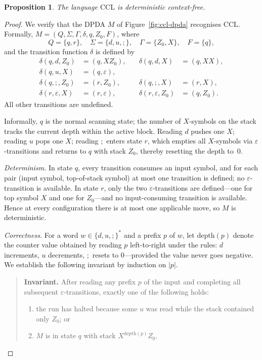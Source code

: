 \documentclass[11pt,a4paper]{article}
\newtheorem{proposition}[theorem]{Proposition}
\begin{document}
\begin{proposition}\label{prop:ccl-dcfl}
The language $\mathrm{CCL}$ is deterministic context-free.
\end{proposition}

\begin{proof}
We verify that the DPDA $M$ of Figure~\ref{fig:ccl-dpda} recognises
$\mathrm{CCL}$. Formally, $M=(Q,\Sigma,\Gamma,\delta,q,Z_0,F)$, where
\[
  Q = \{q, r\},\quad
  \Sigma = \{d, u, ;\},\quad
  \Gamma = \{Z_0, X\},\quad
  F = \{q\},
\]
and the transition function $\delta$ is defined by
\[
\begin{aligned}
  \delta(q, d, Z_0) &= (q, XZ_0), &\quad \delta(q, d, X) &= (q, XX),\\
  \delta(q, u, X)   &= (q, \varepsilon),\\
  \delta(q, ;, Z_0) &= (r, Z_0),  &\quad \delta(q, ;, X) &= (r, X),\\
  \delta(r, \varepsilon, X)   &= (r, \varepsilon), &\quad
  \delta(r, \varepsilon, Z_0) &= (q, Z_0).
\end{aligned}
\]
All other transitions are undefined.

Informally, $q$ is the normal scanning state; the number of $X$-symbols on
the stack tracks the current depth within the active block.
Reading $d$ pushes one $X$; reading $u$ pops one $X$; reading $;$ enters
state $r$, which empties all $X$-symbols via $\varepsilon$-transitions and
returns to $q$ with stack $Z_0$, thereby resetting the depth to~$0$.

\smallskip
\noindent\textit{Determinism.}
In state $q$, every transition consumes an input symbol, and for each pair
(input symbol, top-of-stack symbol) at most one transition is defined; no
$\varepsilon$-transition is available.
In state $r$, only the two $\varepsilon$-transitions are defined---one for
top symbol $X$ and one for $Z_0$---and no input-consuming transition is
available.
Hence at every configuration there is at most one applicable move, so $M$
is deterministic.

\smallskip
\noindent\textit{Correctness.}
For a word $w\in\{d,u,;\}^{*}$ and a prefix $p$ of $w$, let
$\mathrm{depth}(p)$ denote the counter value obtained by reading $p$
left-to-right under the rules: $d$ increments, $u$ decrements, $;$ resets
to $0$---provided the value never goes negative.
We establish the following invariant by induction on $|p|$.

\begin{quote}
\textbf{Invariant.}
After reading any prefix $p$ of the input and completing all subsequent
$\varepsilon$-transitions, exactly one of the following holds:
\begin{enumerate}[label=\textup{(\roman*)},leftmargin=2.2em]
  \item the run has halted because some $u$ was read while the stack
        contained only $Z_0$; or
  \item $M$ is in state $q$ with stack $X^{\mathrm{depth}(p)}Z_0$.
\end{enumerate}
\end{quote}


\end{proof}
\end{document}
